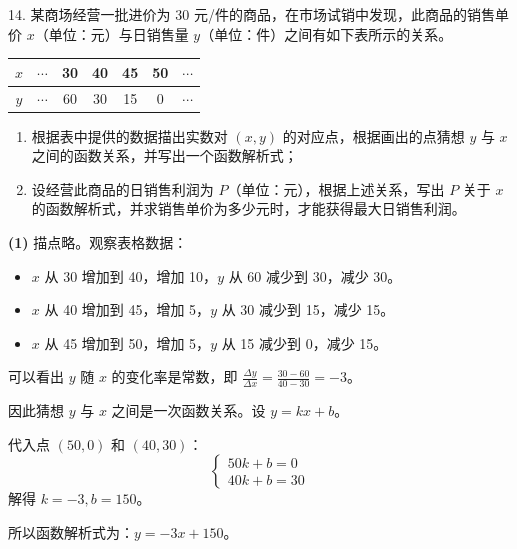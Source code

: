 \documentclass[10pt,aspectratio=169,serif,fleqn]{beamer}
\begin{document}
\begin{frame}[t]
	14. 某商场经营一批进价为 30 元/件的商品，在市场试销中发现，此商品的销售单价 \(x\)（单位：元）与日销售量 \(y\)（单位：件）之间有如下表所示的关系。
	
	\begin{center}
		\begin{tabular}{|c|c|c|c|c|c|c|}
			\hline
			\(x\) & \(\cdots\) & 30 & 40 & 45 & 50 & \(\cdots\) \\
			\hline
			\(y\) & \(\cdots\) & 60 & 30 & 15 & 0 & \(\cdots\) \\
			\hline
		\end{tabular}
	\end{center}
	
	\begin{enumerate}
		\item[(1)] 根据表中提供的数据描出实数对 \((x, y)\) 的对应点，根据画出的点猜想 \(y\) 与 \(x\) 之间的函数关系，并写出一个函数解析式；
		\item[(2)] 设经营此商品的日销售利润为 \(P\)（单位：元），根据上述关系，写出 \(P\) 关于 \(x\) 的函数解析式，并求销售单价为多少元时，才能获得最大日销售利润。
	\end{enumerate}
\end{frame}

\begin{frame}
	\begin{tcolorbox}[colback=orange!10,colframe=orange,title=\textbf{解：}]		
		\textbf{(1)} 描点略。观察表格数据：
		
		\begin{itemize}
			\item \(x\) 从 30 增加到 40，增加 10，\(y\) 从 60 减少到 30，减少 30。
			\item \(x\) 从 40 增加到 45，增加 5，\(y\) 从 30 减少到 15，减少 15。
			\item \(x\) 从 45 增加到 50，增加 5，\(y\) 从 15 减少到 0，减少 15。
		\end{itemize}
		
		可以看出 \(y\) 随 \(x\) 的变化率是常数，即 \(\frac{\Delta y}{\Delta x} = \frac{30-60}{40-30} = -3\)。
		
		因此猜想 \(y\) 与 \(x\) 之间是一次函数关系。设 \(y = kx + b\)。
		
		代入点 \((50, 0)\) 和 \((40, 30)\)：
		\[
		\begin{cases} 
			50k + b = 0 \\ 
			40k + b = 30 
		\end{cases}
		\]
		解得 \(k = -3, b = 150\)。
		
		所以函数解析式为：\textbf{\(y = -3x + 150\)}。
		
		
		
	\end{tcolorbox}
\end{frame}
\end{document}

